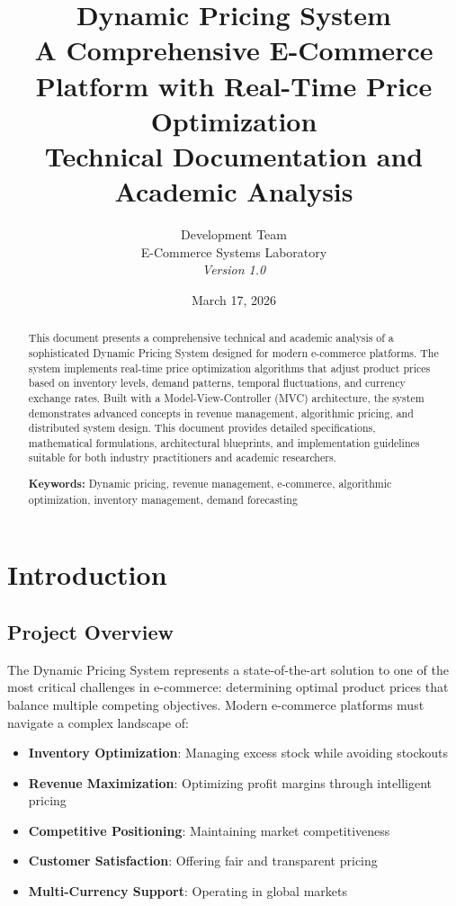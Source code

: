\documentclass[12pt,a4paper,oneside]{report}
\title{
    \textbf{Dynamic Pricing System} \\
    \large A Comprehensive E-Commerce Platform with Real-Time Price Optimization \\
    \vspace{0.5cm}
    \large Technical Documentation and Academic Analysis
}
\author{
    Development Team \\
    E-Commerce Systems Laboratory \\
    \vspace{0.3cm}
    \textit{Version 1.0}
}
\date{March 17, 2026}
\begin{document}
\maketitle

\begin{abstract}
    This document presents a comprehensive technical and academic analysis of a sophisticated Dynamic Pricing System designed for modern e-commerce platforms. The system implements real-time price optimization algorithms that adjust product prices based on inventory levels, demand patterns, temporal fluctuations, and currency exchange rates. Built with a Model-View-Controller (MVC) architecture, the system demonstrates advanced concepts in revenue management, algorithmic pricing, and distributed system design. This document provides detailed specifications, mathematical formulations, architectural blueprints, and implementation guidelines suitable for both industry practitioners and academic researchers.
    
    \textbf{Keywords:} Dynamic pricing, revenue management, e-commerce, algorithmic optimization, inventory management, demand forecasting
\end{abstract}

\tableofcontents
\newpage

\listoffigures
\newpage

\listoftables
\newpage


\chapter{Introduction}

\section{Project Overview}

The Dynamic Pricing System represents a state-of-the-art solution to one of the most critical challenges in e-commerce: determining optimal product prices that balance multiple competing objectives. Modern e-commerce platforms must navigate a complex landscape of:

\begin{itemize}
    \item \textbf{Inventory Optimization}: Managing excess stock while avoiding stockouts
    \item \textbf{Revenue Maximization}: Optimizing profit margins through intelligent pricing
    \item \textbf{Competitive Positioning}: Maintaining market competitiveness
    \item \textbf{Customer Satisfaction}: Offering fair and transparent pricing
    \item \textbf{Multi-Currency Support}: Operating in global markets
\end{itemize}
\end{document}

